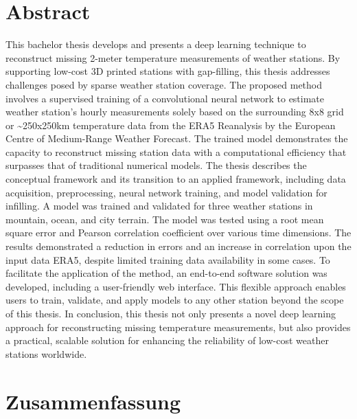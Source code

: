 \section*{Abstract}
\label{sec: abstract}

This bachelor thesis develops and presents a deep learning technique to reconstruct missing 2-meter temperature measurements of weather stations.
By supporting low-cost 3D printed stations with gap-filling, this thesis addresses challenges posed by sparse weather station coverage.
The proposed method involves a supervised training of a convolutional neural network to estimate weather station's hourly measurements solely based on the surrounding 8x8 grid or \textasciitilde 250x250km temperature data from the ERA5 Reanalysis by the European Centre of Medium-Range Weather Forecast.
The trained model demonstrates the capacity to reconstruct missing station data with a computational efficiency that surpasses that of traditional numerical models.
The thesis describes the conceptual framework and its transition to an applied framework, including data acquisition, preprocessing, neural network training, and model validation for infilling.
A model was trained and validated for three weather stations in mountain, ocean, and city terrain. The model was tested using a root mean square error and Pearson correlation coefficient over various time dimensions.
The results demonstrated a reduction in errors and an increase in correlation upon the input data ERA5, despite limited training data availability in some cases. To facilitate the application of the method, an end-to-end software solution was developed, including a user-friendly web interface.
This flexible approach enables users to train, validate, and apply models to any other station beyond the scope of this thesis.
In conclusion, this thesis not only presents a novel deep learning approach for reconstructing missing temperature measurements, but also provides a practical, scalable solution for enhancing the reliability of low-cost weather stations worldwide.

\newpage

\section*{Zusammenfassung}

